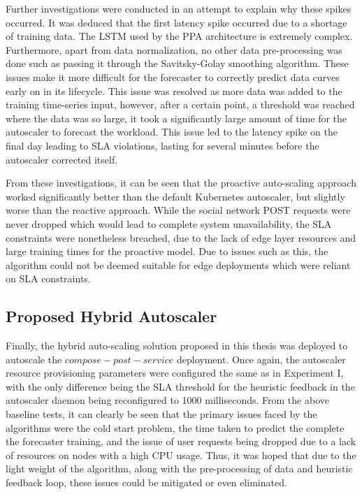 Further investigations were conducted in an attempt to explain why these spikes occurred. It was deduced that the first latency spike occurred due to a shortage of training data. The LSTM used by the PPA architecture is extremely complex. Furthermore, apart from data normalization, no other data pre-processing was done such as passing it through the Savitsky-Golay smoothing algorithm. These issues make it more difficult for the forecaster to correctly predict data curves early on in its lifecycle. This issue was resolved as more data was added to the training time-series input, however, after a certain point, a threshold was reached where the data was so large, it took a significantly large amount of time for the autoscaler to forecast the workload. This issue led to the latency spike on the final day leading to SLA violations, lasting for several minutes before the autoscaler corrected itself.\par

From these investigations, it can be seen that the proactive auto-scaling approach worked significantly better than the default Kubernetes autoscaler, but slightly worse than the reactive approach. While the social network POST requests were never dropped which would lead to complete system unavailability, the SLA constraints were nonetheless breached, due to the lack of edge layer resources and large training times for the proactive model. Due to issues such as this, the algorithm could not be deemed suitable for edge deployments which were reliant on SLA constraints.\par

\subsection {Proposed Hybrid Autoscaler}
\label{subsec:ch5-exp2-hybrid-algo}

Finally, the hybrid auto-scaling solution proposed in this thesis was deployed to autoscale the $compose-post-service$ deployment. Once again, the autoscaler resource provisioning parameters were configured the same as in Experiment I, with the only difference being the SLA threshold for the heuristic feedback in the autoscaler daemon being reconfigured to 1000 milliseconds. From the above baseline tests, it can clearly be seen that the primary issues faced by the algorithms were the cold start problem, the time taken to predict the complete the forecaster training, and the issue of user requests being dropped due to a lack of resources on nodes with a high CPU usage. Thus, it was hoped that due to the light weight of the algorithm, along with the pre-processing of data and heuristic feedback loop, these issues could be mitigated or even eliminated.\par

